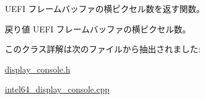 U\+E\+FI フレームバッファの横ピクセル数を返す関数。 \begin{DoxyReturn}{戻り値}
U\+E\+FI フレームバッファの横ピクセル数。 
\end{DoxyReturn}


このクラス詳解は次のファイルから抽出されました\+:\begin{DoxyCompactItemize}
\item 
\hyperlink{display__console_8h}{display\+\_\+console.\+h}\item 
\hyperlink{intel64__display__console_8cpp}{intel64\+\_\+display\+\_\+console.\+cpp}\end{DoxyCompactItemize}
